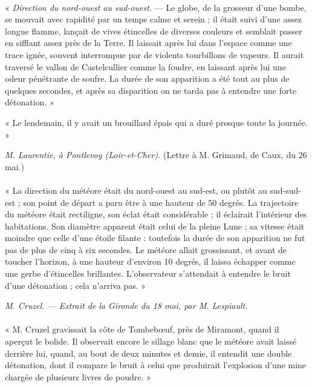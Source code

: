 \documentclass[a4paper, 11pt, oneside, polutonikogreek, french]{article}
\begin{document}
\paragraph{}
« \emph{Direction du nord-ouest au sud-ouest.} --- Le globe, de la grosseur d'une bombe, se mouvait avec rapidité par un temps calme et serein ; il était suivi d'une assez longue flamme, lançait de vives étincelles de diverses couleurs et semblait passer en sifflant assez près de la Terre. Il laissait après lui dans l'espace comme une trace ignée, souvent interrompue par de violents tourbillons de vapeurs. Il aurait traversé le vallon de Castelcullier comme la foudre, en laissant après lui une odeur pénétrante de soufre. La durée de son apparition a été tout au plus de quelques secondes, et après sa disparition on ne tarda pas à entendre une forte détonation. »

« Le lendemain, il y avait un brouillard épais qui a duré presque toute la journée. »
\begin{center}
\emph{M. Laurentie, à Pontlevoy (Loir-et-Cher).} (Lettre à M. Grimaud, de Caux, du 26 mai.)
\end{center}
\paragraph{}
« La direction du météore était du nord-ouest au sud-est, ou plutôt au sud-sud-est ; son point de départ a paru être à une hauteur de 50 degrés. La trajectoire du météore était rectiligne, son éclat était considérable ; il éclairait l'intérieur des habitations. Son diamètre apparent était celui de la pleine Lune ; sa vitesse était moindre que celle d'une étoile filante : toutefois la durée de son apparition ne fut pas de plus de cinq à six secondes. Le météore allait grossissant, et avant de toucher l'horizon, à une hauteur d'environ 10 degrés, il laissa échapper comme une gerbe d'étincelles brillantes. L'observateur s'attendait à entendre le bruit d'une détonation ; cela n'arriva pas. »
\begin{center}
\emph{M. Cruzel. --- Extrait de la Gironde du 18 mai, par M. Lespiault.}
\end{center}
\paragraph{}
« M. Cruzel gravissait la côte de Tombebœuf, près de Miramont, quand il aperçut le bolide. Il observait encore le sillage blanc que le météore avait laissé derrière lui, quand, au bout de deux minutes et demie, il entendit une double détonation, dont il compare le bruit à celui que produirait l'explosion d'une mine chargée de plusieurs livres de poudre. »
\end{document}
